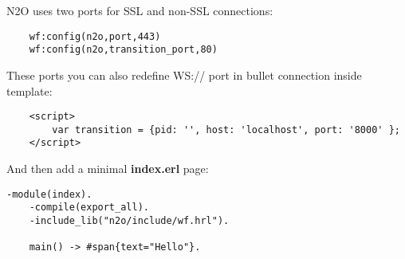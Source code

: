 N2O uses two ports for SSL and non-SSL connections: 

\begin{lstlisting}
    wf:config(n2o,port,443)
    wf:config(n2o,transition_port,80)
\end{lstlisting}

These ports you can also redefine WS:// port in bullet connection inside template:

\begin{lstlisting}
    <script>
        var transition = {pid: '', host: 'localhost', port: '8000' };
    </script>
\end{lstlisting}

And then add a minimal {\bf index.erl} page:

\begin{lstlisting}[caption=index.erl]
    -module(index).
    -compile(export_all).
    -include_lib("n2o/include/wf.hrl").

    main() -> #span{text="Hello"}.
\end{lstlisting}
